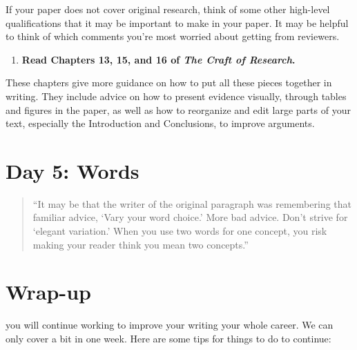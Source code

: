 \documentclass[]{tufte-book}
\providecommand{\tightlist}{%
  \setlength{\itemsep}{0pt}\setlength{\parskip}{0pt}}
\begin{document}
If your paper does not cover original research, think of some other high-level
qualifications that it may be important to make in your paper. It may be helpful
to think of which comments you're most worried about getting from reviewers.

\begin{enumerate}
\def\labelenumi{\arabic{enumi}.}
\setcounter{enumi}{14}
\tightlist
\item
  \textbf{Read Chapters 13, 15, and 16 of \emph{The Craft of Research}.}
\end{enumerate}

These chapters give more guidance on how to put all these pieces together in
writing. They include advice on how to present evidence visually, through tables
and figures in the paper, as well as how to reorganize and edit large parts of
your text, especially the Introduction and Conclusions, to improve arguments.

\hypertarget{day-5-words}{%
\chapter{Day 5: Words}\label{day-5-words}}


\begin{quote}
``It may be that the writer of the original paragraph was remembering that
familiar advice, `Vary your word choice.' More bad advice. Don't strive for
`elegant variation.' When you use two words for one concept, you risk making
your reader think you mean two concepts.''
\end{quote}

\hypertarget{wrap-up}{%
\chapter{Wrap-up}\label{wrap-up}}

 you will continue working to improve your
writing your whole career. We can only cover a bit in one week. Here are some tips for
things to do to continue:
\end{document}
